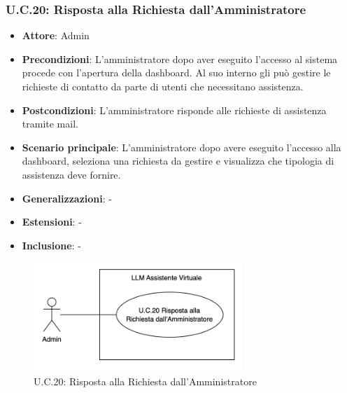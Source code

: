 \subsubsection{U.C.20: Risposta alla Richiesta dall’Amministratore} %
\begin{itemize}
    \item \textbf{Attore}: Admin
    \item \textbf{Precondizioni}: L’amministratore dopo aver eseguito l’accesso al sistema procede con l’apertura della dashboard. 
    Al suo interno gli può gestire le richieste di contatto da parte di utenti che necessitano assistenza. 
    \item \textbf{Postcondizioni}: L’amministratore risponde alle richieste di assistenza tramite mail.
    \item \textbf{Scenario principale}: L’amministratore dopo avere eseguito l’accesso alla dashboard, seleziona una richiesta da gestire e visualizza che tipologia di assistenza deve fornire. 
    \item \textbf{Generalizzazioni}: -
    \item \textbf{Estensioni}: -
    \item \textbf{Inclusione}: -
\end{itemize}
\begin{figure}[H]
    \centering
    \includegraphics[width=0.7\textwidth]{img/UC20.png}
    \caption{U.C.20: Risposta alla Richiesta dall’Amministratore}
\end{figure}
\newpage

